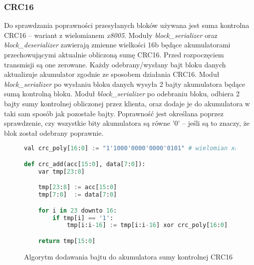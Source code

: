 \subsubsection{CRC16}
\label{crc}
Do sprawdzania poprawności przesyłanych bloków używana jest suma kontrolna CRC16 -- wariant z wielomianem \textit{x8005}. Moduły \textit{block\_serializer} oraz \textit{block\_deserializer} zawierają zmienne wielkości 16b będące akumulatorami przechowującymi aktualnie obliczoną sumę CRC16. Przed rozpoczęciem transmisji są one zerowane. Każdy odebrany/wysłany bajt bloku danych aktualizuje akumulator zgodnie ze sposobem działania CRC16. Moduł \textit{block\_serializer} po wysłaniu bloku danych wysyła 2 bajty akumulatora będące sumą kontrolną bloku. Moduł \textit{block\_serializer} po odebraniu bloku, odbiera 2 bajty sumy kontrolnej obliczonej przez klienta, oraz dodaje je do akumulatora w taki sam sposób jak pozostałe bajty. Poprawność jest określana poprzez sprawdzenie, czy wszystkie bity akumulatora są równe {'0'} -- jeśli są to znaczy, że blok został odebrany poprawnie.

\begin{figure}[!h]
\begin{lstlisting}[language=Python, basicstyle=\ttfamily, autogobble=true, tabsize=3, morekeywords={downto, val, var}]
val crc_poly[16:0] := "1'1000'0000'0000'0101" # wielomian x8005

def crc_add(acc[15:0], data[7:0]):
	var tmp[23:0]

	tmp[23:8] := acc[15:0]
	tmp[7:0]  := data[7:0]

	for i in 23 downto 16:
		if tmp[i] == '1':
			tmp[i:i-16] := tmp[i:i-16] xor crc_poly[16:0]

	return tmp[15:0]
\end{lstlisting}
\caption{Algorytm dodawania bajtu do akumulatora sumy kontrolnej CRC16}
\end{figure}